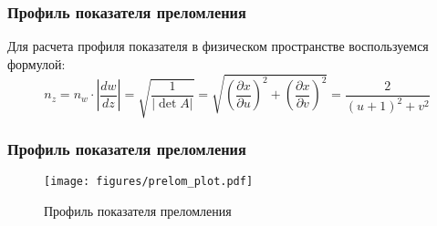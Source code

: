 \begin{frame}\frametitle{Профиль показателя преломления}
  Для расчета профиля показателя в физическом пространстве воспользуемся формулой:
  \begin{equation}
    n_z =
    n_w \cdot \left| \frac{d w}{d z} \right| =
    \sqrt{\frac{1}{| \det A |}} =
    \sqrt{\left(\frac{\partial x}{\partial u}\right)^2 + \left(\frac{\partial x}{\partial v}\right)^2} =
    \frac{2}{(u+1)^2+v^2}
    \label{eq:pok_prelom}
  \end{equation}

\end{frame}

\begin{frame}\frametitle{Профиль показателя преломления}
  \begin{figure}
    \texttt{[image: figures/prelom\_plot.pdf]}
    \caption{Профиль показателя преломления}
  \end{figure}
\end{frame}
